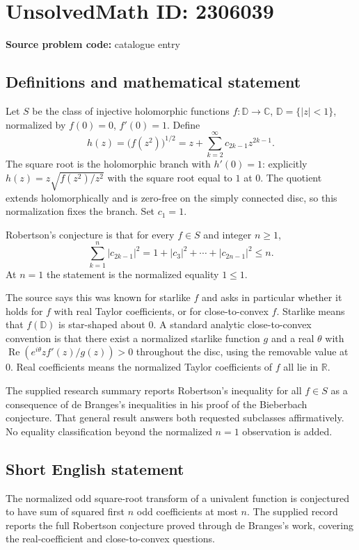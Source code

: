 \documentclass[11pt]{article}
\newcommand{\R}{\mathbb{R}}
\newcommand{\C}{\mathbb{C}}
\begin{document}
\section*{UnsolvedMath ID: 2306039}
\textbf{Source problem code:} catalogue entry
\subsection{Definitions and mathematical statement}
Let $S$ be the class of injective holomorphic functions $f:\mathbb D\to\C$, $\mathbb D=\{|z|<1\}$, normalized by $f(0)=0$, $f'(0)=1$. Define
\[
h(z)=\bigl(f(z^2)\bigr)^{1/2}
=z+\sum_{k=2}^\infty c_{2k-1}z^{2k-1}.
\]
The square root is the holomorphic branch with $h'(0)=1$: explicitly $h(z)=z\sqrt{f(z^2)/z^2}$ with the square root equal to $1$ at $0$. The quotient extends holomorphically and is zero-free on the simply connected disc, so this normalization fixes the branch. Set $c_1=1$.

Robertson's conjecture is that for every $f\in S$ and integer $n\geq1$,
\[
\sum_{k=1}^n|c_{2k-1}|^2
=1+|c_3|^2+\cdots+|c_{2n-1}|^2\leq n.
\]
At $n=1$ the statement is the normalized equality $1\leq1$.

The source says this was known for starlike $f$ and asks in particular whether it holds for $f$ with real Taylor coefficients, or for close-to-convex $f$. Starlike means that $f(\mathbb D)$ is star-shaped about $0$. A standard analytic close-to-convex convention is that there exist a normalized starlike function $g$ and a real $\theta$ with $\operatorname{Re}(e^{i\theta}zf'(z)/g(z))>0$ throughout the disc, using the removable value at $0$. Real coefficients means the normalized Taylor coefficients of $f$ all lie in $\R$.

The supplied research summary reports Robertson's inequality for all $f\in S$ as a consequence of de Branges's inequalities in his proof of the Bieberbach conjecture. That general result answers both requested subclasses affirmatively. No equality classification beyond the normalized $n=1$ observation is added.
\subsection{Short English statement}
The normalized odd square-root transform of a univalent function is conjectured to have sum of squared first $n$ odd coefficients at most $n$. The supplied record reports the full Robertson conjecture proved through de Branges's work, covering the real-coefficient and close-to-convex questions.
\end{document}
